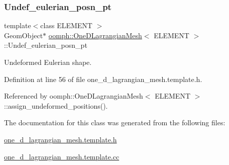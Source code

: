\subsubsection{\texorpdfstring{Undef\+\_\+eulerian\+\_\+posn\+\_\+pt}{Undef\_eulerian\_posn\_pt}}
{\footnotesize\ttfamily template$<$class E\+L\+E\+M\+E\+NT $>$ \\
Geom\+Object$\ast$ \hyperlink{classoomph_1_1OneDLagrangianMesh}{oomph\+::\+One\+D\+Lagrangian\+Mesh}$<$ E\+L\+E\+M\+E\+NT $>$\+::Undef\+\_\+eulerian\+\_\+posn\+\_\+pt\hspace{0.3cm}{\ttfamily [private]}}



Undeformed Eulerian shape. 



Definition at line 56 of file one\+\_\+d\+\_\+lagrangian\+\_\+mesh.\+template.\+h.



Referenced by oomph\+::\+One\+D\+Lagrangian\+Mesh$<$ E\+L\+E\+M\+E\+N\+T $>$\+::assign\+\_\+undeformed\+\_\+positions().



The documentation for this class was generated from the following files\+:\begin{DoxyCompactItemize}
\item 
\hyperlink{one__d__lagrangian__mesh_8template_8h}{one\+\_\+d\+\_\+lagrangian\+\_\+mesh.\+template.\+h}\item 
\hyperlink{one__d__lagrangian__mesh_8template_8cc}{one\+\_\+d\+\_\+lagrangian\+\_\+mesh.\+template.\+cc}\end{DoxyCompactItemize}
